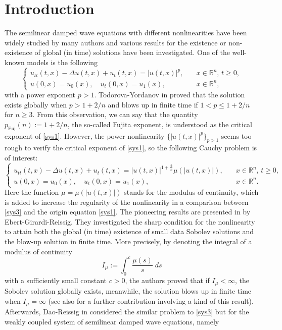 \documentclass[11pt,reqno]{amsart}
\numberwithin{equation}{section}
\newcommand{\ity}{\infty}
\theoremstyle{plain}
\begin{document}
\section{Introduction}
\quad The semilinear damped wave equations with different nonlinearities have been widely studied by many authors and various results for the existence or non-existence of global (in time) solutions have been investigated. One of the well-known models is the following
\begin{equation}\label{sys1}
\begin{cases}
u_{tt}(t,x)-\Delta u(t,x) +u_t(t,x)=|u(t,x)|^p,\quad &x\in \mathbb{R}^n, \,t\geq 0,\\
u(0,x)=u_0(x), \quad u_t(0,x)=u_1(x), \quad &x\in \mathbb{R}^n,
\end{cases}
\end{equation}
with a power exponent $p>1$. Todorova-Yordanov in \cite{Todorova2001} proved that the solution exists globally when $p>1+2/n$ and blows up in finite time if $1<p\leq 1+2/n$ for $n\geq 3$. From this observation, we can say that the quantity $p_{\text{Fuj}}(n):=1+2/n$, the so-called Fujita exponent, is understood as the critical exponent of \eqref{sys1}. However, the power nonlinearity $\{|u(t,x)|^p\}_{p>1}$ seems too rough to verify the critical exponent of \eqref{sys1}, so the following Cauchy problem is of interest:
\begin{equation}\label{sys3}
\begin{cases}
u_{tt}(t,x)-\Delta u(t,x) +u_t(t,x)=|u(t,x)|^{1+\frac{2}{n}}\mu(|u(t,x)|),\quad &x\in \mathbb{R}^n,\, t\geq 0, \\
u(0,x)=u_0(x),\quad u_t(0,x)=u_1(x), \quad &x\in \mathbb{R}^n.
\end{cases}
\end{equation}
Here the function $\mu=\mu(|u(t,x)|)$ stands for the modulus of continuity, which is added to increase the regularity of the nonlinearity in a comparison between \eqref{sys3} and the origin equation \eqref{sys1}. The pioneering results are presented in \cite{EbeGirRei2020} by Ebert-Girardi-Reissig. They investigated the sharp condition for the nonlinearity to attain both the global (in time) existence of small data Sobolev solutions and the blow-up solution in finite time. More precisely, by denoting the integral of a modulus of continuity
\[
I_\mu:= \int_{0}^{c}\frac{\mu(s)}{s}\;ds
\]
with a sufficiently small constant $c>0$, the authors proved that if $I_\mu< \ity$, the Sobolev solution globally exists, meanwhile, the solution blows up in finite time when $I_\mu= \ity$ (see also \cite{TangDuong2026} for a further contribution involving a kind of this result). Afterwards, Dao-Reissig in \cite{AnhRei2021} considered the similar problem to \eqref{sys3} but for the weakly coupled system of semilinear damped wave equations, namely
\end{document}

